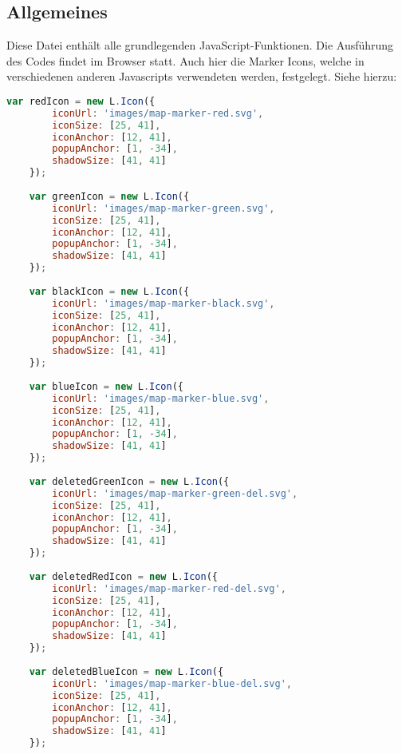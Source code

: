 \subsection{Allgemeines} Diese Datei enthält alle grundlegenden JavaScript-Funktionen.
Die Ausführung des Codes findet im Browser statt. Auch hier die Marker Icons, welche in verschiedenen anderen Javascripts verwendeten werden, festgelegt. Siehe hierzu:
\begin{lstlisting}[language=JavaScript]
	var redIcon = new L.Icon({
		iconUrl: 'images/map-marker-red.svg',
		iconSize: [25, 41],
		iconAnchor: [12, 41],
		popupAnchor: [1, -34],
		shadowSize: [41, 41]
	});
	
	var greenIcon = new L.Icon({
		iconUrl: 'images/map-marker-green.svg',
		iconSize: [25, 41],
		iconAnchor: [12, 41],
		popupAnchor: [1, -34],
		shadowSize: [41, 41]
	});
	
	var blackIcon = new L.Icon({
		iconUrl: 'images/map-marker-black.svg',
		iconSize: [25, 41],
		iconAnchor: [12, 41],
		popupAnchor: [1, -34],
		shadowSize: [41, 41]
	});
	
	var blueIcon = new L.Icon({
		iconUrl: 'images/map-marker-blue.svg',
		iconSize: [25, 41],
		iconAnchor: [12, 41],
		popupAnchor: [1, -34],
		shadowSize: [41, 41]
	});
	
	var deletedGreenIcon = new L.Icon({
		iconUrl: 'images/map-marker-green-del.svg',
		iconSize: [25, 41],
		iconAnchor: [12, 41],
		popupAnchor: [1, -34],
		shadowSize: [41, 41]
	});
	
	var deletedRedIcon = new L.Icon({
		iconUrl: 'images/map-marker-red-del.svg',
		iconSize: [25, 41],
		iconAnchor: [12, 41],
		popupAnchor: [1, -34],
		shadowSize: [41, 41]
	});
	
	var deletedBlueIcon = new L.Icon({
		iconUrl: 'images/map-marker-blue-del.svg',
		iconSize: [25, 41],
		iconAnchor: [12, 41],
		popupAnchor: [1, -34],
		shadowSize: [41, 41]
	});
\end{lstlisting}